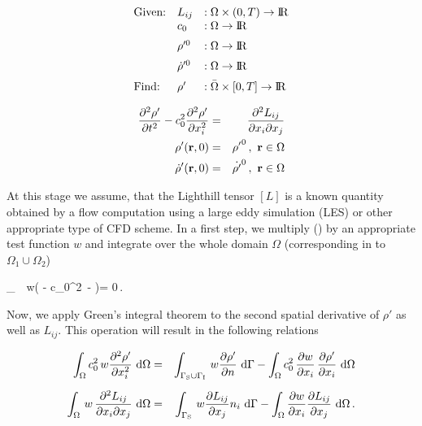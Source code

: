 \documentclass[a4paper,10pt]{article}
\begin{document}
\[
\begin{array}{lll}
\hbox{Given:}& L_{ij}&: \Omega \times (0,T) \rightarrow {{{\rm I}\!{\rm R}}}\\
&c_0&: \Omega  \rightarrow {{{\rm I}\!{\rm R}}}\\[2mm]
&\rho'^0&: \Omega  \rightarrow {{{\rm I}\!{\rm R}}}\\[2mm]
&\dot \rho'^0&: \Omega  \rightarrow {{{\rm I}\!{\rm R}}}\\[2mm]
\hbox{Find:} &\rho'&: \bar{\Omega} \times [0,T] \rightarrow
{{{\rm I}\!{\rm R}}}
\end{array}
\]
\vspace*{-4mm}

\begin{center}
\begin{eqnarray}
\label{eq:strongF}
\frac{\partial^2 \rho'}{\partial t^2} - c_0^2  \frac{\partial^2 \rho'}{\partial x_i^2} 
&=& \frac{\partial^2 L_{ij}}{\partial x_i \partial x_j}\\
\rho'({\bf r},0) &=& {\rho'}^0 \, , \ {\bf r} \in \Omega \nonumber \\
\dot \rho' ({\bf r},0) &=& \dot {\rho'}^0 \, , \ {\bf r} \in \Omega \nonumber 
\end{eqnarray}
\end{center}

\noindent
At  this stage  we assume,  that  the Lighthill  tensor $[L]$  is a  known
quantity  obtained by  a flow  computation using  a large  eddy simulation
(LES)  or other  appropriate  type of  CFD  scheme. In  a  first step,  we
multiply () by an appropriate test function $w$ and integrate
over the  whole domain $\Omega$ (corresponding  in 
to $\Omega_1 \cup \Omega_2$)

\int\limits_\Omega \,
\, w\left(  -
    c_0^2\, -  \right)\rd\Omega = 0\,.
\ee

\noindent
Now, we apply Green's integral theorem to the second spatial derivative of
$\rho'$ as well  as $L_{ij}$. This operation will  result in the following
relations

\begin{eqnarray}
\label{eq:Green1}
\int_\Omega c_0^2\, w  \frac{\partial^2 \rho'}{\partial x_i^2} \, {\,\rm d} \Omega &=&
\int_{\Gamma_{\rm S} \cup \Gamma_{\rm I}}\, w \frac{\partial \rho'}{\partial n}\, {\,\rm d} \Gamma
- \int_\Omega c_0^2\, \frac{\partial w}{\partial x_i} \, \frac{\partial
  \rho'}{\partial x_i} \, {\,\rm d} \Omega \\[2mm] 
\label{eq:Green2}
\int_\Omega \, w\, \frac{\partial^2 L_{ij}}{\partial x_i \partial x_j} \, {\,\rm d} \Omega &=&
\int_{\Gamma_{\rm S}}\, w \frac{\partial L_{ij}}{\partial x_j} n_i\, {\,\rm d} \Gamma
- \int_\Omega \frac{\partial w}{\partial x_i} \frac{\partial
  L_{ij}}{\partial x_j}\, {\,\rm d} \Omega\,. 
\end{eqnarray}
\end{document}
